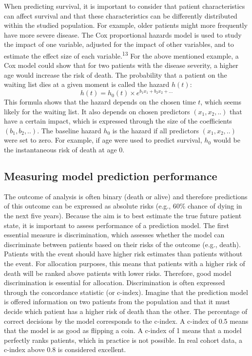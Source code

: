 \documentclass[11pt,english,]{book} %
\begin{document}
When predicting survival, it is important to consider that patient characteristics can affect survival and that these characteristics can be differently distributed within the studied population. For example, older patients might more frequently have more severe disease. The Cox proportional hazards model is used to study the impact of one variable, adjusted for the impact of other variables, and to estimate the effect size of each variable.\textsuperscript{13} For the above mentioned example, a Cox model could show that for two patients with the disease severity, a higher age would increase the risk of death. The probability that a patient on the waiting list dies at a given moment is called the hazard \(h(t)\): \[h(t) = h_{0}(t) \times e^{b_{1}x_{1} + b_{2}x_{2} + ...}\] This formula shows that the hazard depends on the chosen time \(t\), which seems likely for the waiting list. It also depends on chosen predictors \((x_{1},x_{2},..)\) that have a certain impact, which is expressed through the size of the coefficients \((b_{1},b_{2},..)\). The baseline hazard \(h_{0}\) is the hazard if all predictors \((x_{1},x_{2},..)\) were set to zero. For example, if age were used to predict survival, \(h_{0}\) would be the instantaneous risk of death at age 0.

\hypertarget{measuring-model-prediction-performance}{%
\subsection*{Measuring model prediction performance}\label{measuring-model-prediction-performance}}

The outcome of analysis is often binary (death or alive) and therefore predictions of this outcome can be expressed as absolute risks (e.g., 60\% chance of dying in the next five years). Because the aim is to best estimate the true future patient state, it is important to assess performance of a prediction model. The first essential measure is discrimination, which assesses whether the model can discriminate between patients based on their risks of the outcome (e.g., death). Patients with the event should have higher risk estimates than patients without the event. For allocation purposes, this means that patients with a higher risk of death will be ranked above patients with lower risks. Therefore, good model discrimination is essential for allocation. Discrimination is often expressed through the concordance statistic (or c-index). Imagine that the prediction model is offered information on two patients from the population and that it must decide which patient has a higher risk of death than the other. The percentage of correct decisions by the model corresponds to the c-index. A c-index of 0.5 means that the model is as good as flipping a coin. A c-index of 1 means that a model perfectly ranks patients, which in practice is not possible. In real cohort data, a c-index above 0.8 is considered excellent.
\end{document}
